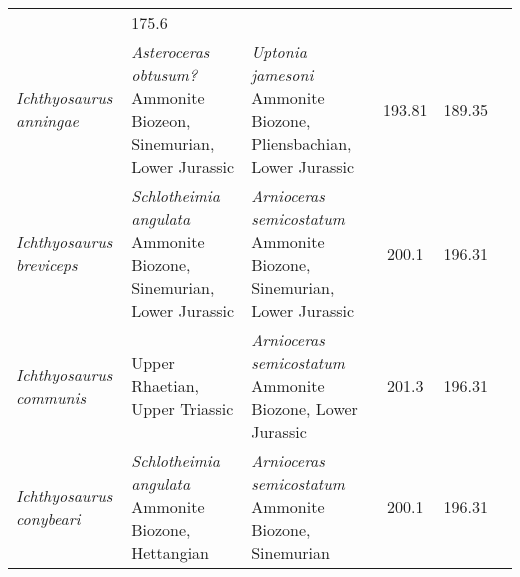 \begin{longtabu}{>{\itshape}lXXSSl}
                                                             & 175.6
                                                             &
                                                             \cite{McGowan2003HoP} \\                    
	Ichthyosaurus anningae                               &
        \emph{\emph{Asteroceras obtusum}?} Ammonite Biozeon, Sinemurian, Lower
        Jurassic                                                    &
        \emph{Uptonia jamesoni} Ammonite Biozone, Pliensbachian, Lower Jurassic
                                                                    & 193.81
                                                                    & 189.35
                                                                    &
                                                                    \cite{Lomax2015JVP} \\                      
	Ichthyosaurus breviceps                              &
        \emph{Schlotheimia angulata} Ammonite Biozone, Sinemurian, Lower
        Jurassic                                                          &
        \emph{Arnioceras semicostatum} Ammonite Biozone, Sinemurian, Lower
        Jurassic                                                        & 200.1
                                                                        & 196.31
                                                                        &
                                                                        \cite{McGowan1974LSCROMa} \\                   
	Ichthyosaurus communis                               & Upper Rhaetian,
        Upper Triassic
                                                             & \emph{Arnioceras
    semicostatum} Ammonite Biozone, Lower Jurassic
                                                             & 201.3
                                                             & 196.31
                                                             &
                                                             \cite{McGowan1974LSCROMa} \\                   
	Ichthyosaurus conybeari                              &
        \emph{Schlotheimia angulata} Ammonite Biozone, Hettangian
                                                             & \emph{Arnioceras
    semicostatum} Ammonite Biozone, Sinemurian
                                                             & 200.1
                                                             & 196.31
                                                             &

\end{longtabu}

